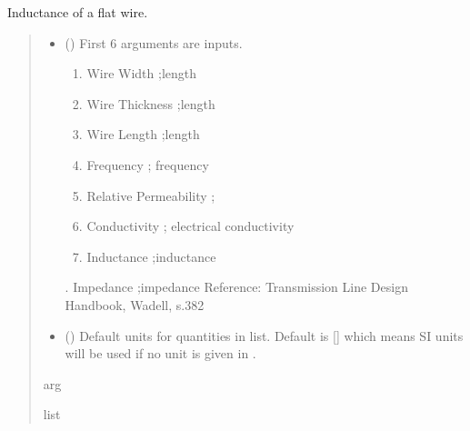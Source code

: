 \documentclass[letterpaper,10pt,english]{sphinxmanual}
\begin{document}

\begin{fulllineitems}
\label{\detokenize{components:components.L_StraightFlatWire}}
\pysigstartsignatures
{}
\pysigstopsignatures
\sphinxAtStartPar
Inductance of a flat wire.
\begin{quote}\begin{description}
\begin{itemize}
\item {}
\sphinxAtStartPar
{} () \textendash{}
\sphinxAtStartPar
First 6 arguments are inputs.
\begin{enumerate}
%
\item {}
\sphinxAtStartPar
Wire Width ;length

\item {}
\sphinxAtStartPar
Wire Thickness ;length

\item {}
\sphinxAtStartPar
Wire Length ;length

\item {}
\sphinxAtStartPar
Frequency ; frequency

\item {}
\sphinxAtStartPar
Relative Permeability ;

\item {}
\sphinxAtStartPar
Conductivity ; electrical conductivity

\item {}
\sphinxAtStartPar
Inductance ;inductance

\end{enumerate}

.  Impedance ;impedance
Reference:  Transmission Line Design Handbook, Wadell, s.382


\item {}
\sphinxAtStartPar
{} (\sphinxstyleliteralemphasis{\sphinxupquote{, }}) \textendash{} Default units for quantities in  list. Default is {[}{]} which means SI units will be used if no unit is given in .

\end{itemize}

\sphinxAtStartPar
arg

\sphinxAtStartPar
list

\end{description}\end{quote}

\end{fulllineitems}
\end{document}
